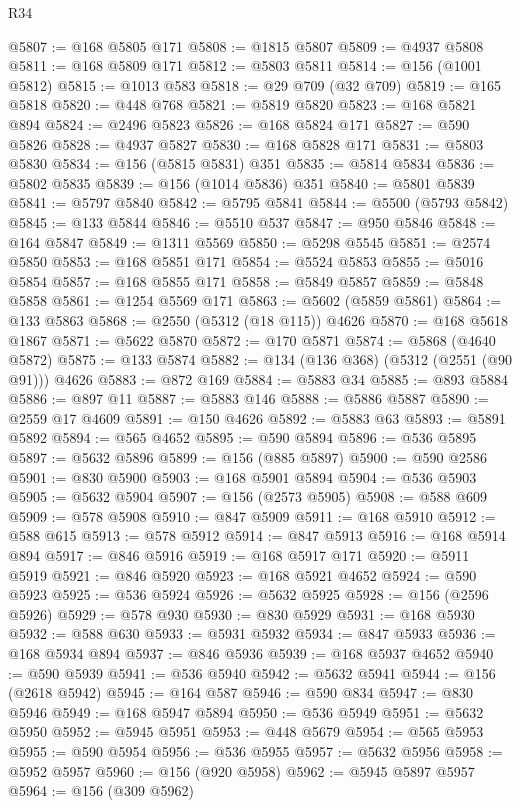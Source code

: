 \begin{lexlean}{R34}
\begin{coremodule}
@5807 := @168 @5805 @171
@5808 := @1815 @5807
@5809 := @4937 @5808
@5811 := @168 @5809 @171
@5812 := @5803 @5811
@5814 := @156 (@1001 @5812)
@5815 := @1013 @583
@5818 := @29 @709 (@32 @709)
@5819 := @165 @5818
@5820 := @448 @768
@5821 := @5819 @5820
@5823 := @168 @5821 @894
@5824 := @2496 @5823
@5826 := @168 @5824 @171
@5827 := @590 @5826
@5828 := @4937 @5827
@5830 := @168 @5828 @171
@5831 := @5803 @5830
@5834 := @156 (@5815 @5831) @351
@5835 := @5814 @5834
@5836 := @5802 @5835
@5839 := @156 (@1014 @5836) @351
@5840 := @5801 @5839
@5841 := @5797 @5840
@5842 := @5795 @5841
@5844 := @5500 (@5793 @5842)
@5845 := @133 @5844
@5846 := @5510 @537
@5847 := @950 @5846
@5848 := @164 @5847
@5849 := @1311 @5569
@5850 := @5298 @5545
@5851 := @2574 @5850
@5853 := @168 @5851 @171
@5854 := @5524 @5853
@5855 := @5016 @5854
@5857 := @168 @5855 @171
@5858 := @5849 @5857
@5859 := @5848 @5858
@5861 := @1254 @5569 @171
@5863 := @5602 (@5859 @5861)
@5864 := @133 @5863
@5868 := @2550 (@5312 (@18 @115)) @4626
@5870 := @168 @5618 @1867
@5871 := @5622 @5870
@5872 := @170 @5871
@5874 := @5868 (@4640 @5872)
@5875 := @133 @5874
@5882 := @134 (@136 @368) (@5312 (@2551 (@90 @91))) @4626
@5883 := @872 @169
@5884 := @5883 @34
@5885 := @893 @5884
@5886 := @897 @11
@5887 := @5883 @146
@5888 := @5886 @5887
@5890 := @2559 @17 @4609
@5891 := @150 @4626
@5892 := @5883 @63
@5893 := @5891 @5892
@5894 := @565 @4652
@5895 := @590 @5894
@5896 := @536 @5895
@5897 := @5632 @5896
@5899 := @156 (@885 @5897)
@5900 := @590 @2586
@5901 := @830 @5900
@5903 := @168 @5901 @5894
@5904 := @536 @5903
@5905 := @5632 @5904
@5907 := @156 (@2573 @5905)
@5908 := @588 @609
@5909 := @578 @5908
@5910 := @847 @5909
@5911 := @168 @5910
@5912 := @588 @615
@5913 := @578 @5912
@5914 := @847 @5913
@5916 := @168 @5914 @894
@5917 := @846 @5916
@5919 := @168 @5917 @171
@5920 := @5911 @5919
@5921 := @846 @5920
@5923 := @168 @5921 @4652
@5924 := @590 @5923
@5925 := @536 @5924
@5926 := @5632 @5925
@5928 := @156 (@2596 @5926)
@5929 := @578 @930
@5930 := @830 @5929
@5931 := @168 @5930
@5932 := @588 @630
@5933 := @5931 @5932
@5934 := @847 @5933
@5936 := @168 @5934 @894
@5937 := @846 @5936
@5939 := @168 @5937 @4652
@5940 := @590 @5939
@5941 := @536 @5940
@5942 := @5632 @5941
@5944 := @156 (@2618 @5942)
@5945 := @164 @587
@5946 := @590 @834
@5947 := @830 @5946
@5949 := @168 @5947 @5894
@5950 := @536 @5949
@5951 := @5632 @5950
@5952 := @5945 @5951
@5953 := @448 @5679
@5954 := @565 @5953
@5955 := @590 @5954
@5956 := @536 @5955
@5957 := @5632 @5956
@5958 := @5952 @5957
@5960 := @156 (@920 @5958)
@5962 := @5945 @5897 @5957
@5964 := @156 (@309 @5962)

\end{coremodule}
\end{lexlean}
